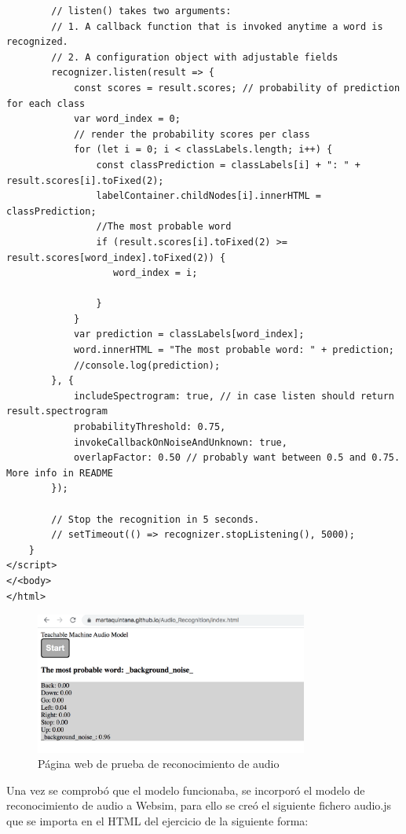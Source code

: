 \begin{lstlisting}
        // listen() takes two arguments:
        // 1. A callback function that is invoked anytime a word is recognized.
        // 2. A configuration object with adjustable fields
        recognizer.listen(result => {
            const scores = result.scores; // probability of prediction for each class
            var word_index = 0;
            // render the probability scores per class
            for (let i = 0; i < classLabels.length; i++) {
                const classPrediction = classLabels[i] + ": " + result.scores[i].toFixed(2);
                labelContainer.childNodes[i].innerHTML = classPrediction;
                //The most probable word
                if (result.scores[i].toFixed(2) >= result.scores[word_index].toFixed(2)) {
                   word_index = i;

                }
            }
            var prediction = classLabels[word_index];
            word.innerHTML = "The most probable word: " + prediction;
            //console.log(prediction);
        }, {
            includeSpectrogram: true, // in case listen should return result.spectrogram
            probabilityThreshold: 0.75,
            invokeCallbackOnNoiseAndUnknown: true,
            overlapFactor: 0.50 // probably want between 0.5 and 0.75. More info in README
        });

        // Stop the recognition in 5 seconds.
        // setTimeout(() => recognizer.stopListening(), 5000);
    }
</script>
</<body>
</html>

\end{lstlisting}


\begin{figure}[H]
    \centering
    \includegraphics[width=0.8\textwidth, height=0.4\textwidth]{chapters/images/audioprueba.png}
    \caption{Página web de prueba de reconocimiento de audio}
    \label{fig:my_label}
\end{figure}

Una vez se comprobó que el modelo funcionaba, se incorporó  el modelo de reconocimiento de audio a Websim, para ello  se creó el siguiente fichero audio.js que se importa en el HTML del ejercicio de la siguiente forma:   

